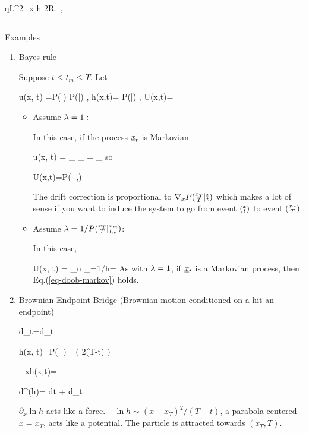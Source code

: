  \beq
qL^2\partial_x h
\to 2R_{\mu,\nu}
\eeq

\hrule
Examples
\begin{enumerate}
\item
Bayes rule

Suppose $t\leq t_m\leq T$. Let

\beq
u(x, t) =\lam P(|)
P(|)
,\quad
h(x,t)=\lam
P(|)
,\quad
U(x,t)=
\eeq

\begin{itemize}
\item Assume $\lambda=1:$

In this case, if the process $\rvx_t$ is Markovian 

\beq
u(x, t) = _{}
_{}
=
_{}
\eeq
so

\beq
U(x,t)=P(| ,)
\label{eq-doob-markov}
\eeq



The drift correction is proportional to
$\nabla_x P({\substack{x_T\\T}}|{\substack{x\\t}})$
which makes a lot of sense
if you want to induce
 the system to go from event  $({\substack{x\\t}})$ to event
$({\substack{x_T\\T}})$.

\item Assume $\lambda=1/P({\substack{x_T\\T}}|{\substack{x_m\\t_m}})$:

In this case,

\beq
U(x, t) = _{u}
_{=1/h=}
\eeq
As with $\lambda=1$, if $\rvx_t$ is a Markovian process, then Eq.(\ref{eq-doob-markov}) holds.




\end{itemize}

\item Brownian Endpoint Bridge (Brownian motion conditioned
on a hit an endpoint)

\beq
d\rvx_t=d\rvB_t
\eeq

\beq
h(x, t)=P(
|)=
\exp\left(
{2(T-t)}
\right)
\eeq

\beq
\partial_x\ln h(x,t)=
\eeq

\beq
d\rvx^{(h)}=
 dt + d\rvB_t
\eeq

$\partial_x \ln h$ acts  like a force. $-\ln h \sim (x-x_T)^2/(T-t)$,
a parabola centered $x=x_T$, 
acts like a potential.
The particle is attracted towards $(x_T, T)$.

\end{enumerate}

